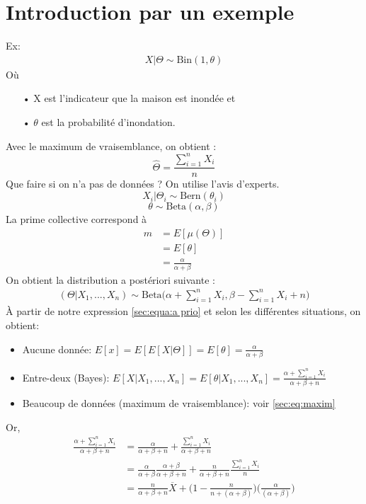 \documentclass[11pt,french]{report}
\begin{document}
\section{Introduction par un exemple}
Ex:
\begin{align*}
X|\Theta \sim \text{Bin}(1, \theta)
\end{align*}
Où
\begin{itemize}
\item[• X] est l'indicateur que la maison est inondée et 
\item[• $\theta$] est la probabilité d'inondation.
\end{itemize}
Avec le maximum de vraisemblance, on obtient :
\begin{equation}
\label{sec:eq:maxim}
\widehat{\Theta} = \frac{\sum_{i =1}^{n} X_i}{n}
\end{equation}
Que faire si on n'a pas de données ? On utilise l'avis d'experts.
\begin{equation}
X_i|\Theta_i \sim \text{Bern}(\theta_i)
\end{equation}
\begin{equation}
\label{sec:equa:a prio}
\theta \sim \text{Beta}(\alpha, \beta)
\end{equation}
La prime collective correspond à 
\begin{align*}
m &= E[\mu(\Theta)] \\
&= E[\theta]\\
&= \frac{\alpha}{\alpha + \beta}
\end{align*}
On obtient la distribution a postériori suivante :
\begin{align*}
(\Theta | X_1, ..., X_n) \sim \text{Beta}\Bigg(\alpha + \sum_{i =1}^{n} X_i, \beta - \sum_{i =1}^{n} X_i + n\Bigg)
\end{align*}
À partir de notre expression \ref{sec:equa:a prio} et selon les différentes situations, on obtient:
\begin{itemize}
\item Aucune donnée: $ E[x] = E[E[X|\Theta]] = E[\theta] = \frac{\alpha}{\alpha + \beta}$
\item Entre-deux (Bayes): $E[X|X_1, ..., X_n] = E[\theta|X_1, ..., X_n] = \frac{\alpha + \sum_{i =1}^{n} X_i}{\alpha + \beta + n}$
\item Beaucoup de données (maximum de vraisemblance): voir \ref{sec:eq:maxim}
\end{itemize}
Or,
\begin{align*}
\frac{\alpha + \sum_{i =1}^{n} X_i}{\alpha + \beta + n} &= \frac{\alpha}{\alpha + \beta + n} + \frac{\sum_{i =1}^{n} X_i}{\alpha + \beta + n}\\
&=\frac{\alpha}{\alpha + \beta}\frac{\alpha + \beta}{\alpha + \beta + n} + \frac{n}{\alpha + \beta + n}\frac{\sum_{i =1}^{n} X_i}{n}\\
&=\frac{n}{\alpha + \beta + n} \overline{X} + \Bigg(1 - \frac{n}{n + (\alpha + \beta)}\Bigg)\Bigg(\frac{\alpha}{(\alpha + \beta)}\Bigg)\\
\end{align*}
\end{document}
